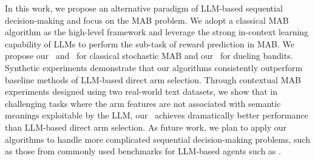 In this work, we propose an alternative paradigm of LLM-based sequential decision-making and focus on the MAB problem.
We adopt a classical MAB algorithm as the high-level framework and leverage the strong in-context learning capability of LLMs to perform the sub-task of reward prediction in MAB.
We propose our \algts~and \algro~for classical stochastic MAB and our \algtsduel~for dueling bandits.
Synthetic experiments demonstrate that our algorithms consistently outperform baseline methods of LLM-based direct arm selection.
Through contextual MAB experiments designed using two real-world text datasets, we show that 
in challenging tasks where the arm features are not associated with semantic meanings exploitable by the LLM,
our \algts~achieves dramatically better performance than LLM-based direct arm selection.
As future work, we plan to apply our algorithms to handle more complicated sequential decision-making problems, such as those from commonly used benchmarks for LLM-based agents such as \citet{liu2023agentbench,wu2023smartplay,xi2024agentgym}.
